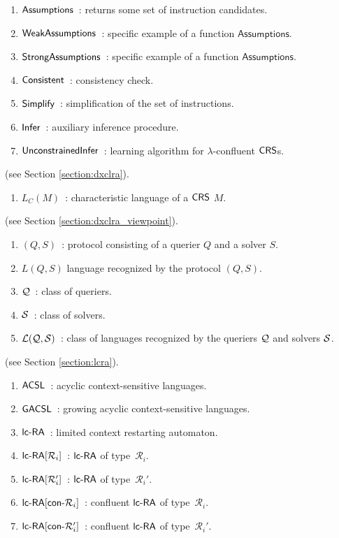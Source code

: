 \begin{enumerate}[]
\item $\textup{\sf Assumptions}$\ : returns some set of instruction candidates.
\item $\textup{\sf WeakAssumptions}$\ : specific example of a function $\mathsf{Assumptions}$.
\item $\textup{\sf StrongAssumptions}$\ : specific example of a function $\mathsf{Assumptions}$.
\item $\textup{\sf Consistent}$\ : consistency check.
\item $\textup{\sf Simplify}$\ : simplification of the set of instructions.
\item $\textup{\sf Infer}$\ : auxiliary inference procedure.
\item $\textup{\sf UnconstrainedInfer}$\ : learning algorithm for $\lambda$-confluent $\textup{\sf CRS\/}$s.
\end{enumerate}


 (see Section \ref{section:dxclra}).

\begin{enumerate}[]
\item $L_C(M)$\ : characteristic language of a $\textup{\sf CRS\/}$ $M$.
\end{enumerate}

 (see Section \ref{section:dxclra_viewpoint}).

\begin{enumerate}[]
\item $(Q, S)$\ : protocol consisting of a querier $Q$ and a solver $S$.
\item $L(Q, S)$ language recognized by the protocol $(Q, S)$.
\item $\mathcal{Q}$\ : class of queriers.
\item $\mathcal{S}$\ : class of solvers.
\item ${\cal L}(\mathcal{Q}, \mathcal{S})$\ : class of languages recognized by the queriers $\mathcal{Q}$ and solvers $\mathcal{S}$.
\end{enumerate}

 (see Section \ref{section:lcra}).

\begin{enumerate}[]
\item $\textup{\sf ACSL}$\ : acyclic context-sensitive languages.
\item $\textup{\sf GACSL}$\ : growing acyclic context-sensitive languages.
\item $\lcRA$\ : limited context restarting automaton.
\item $\lcRA[i]$\ : $\lcRA$ of type~$\mathcal{R}_i$.
\item $\lcRAp[i]$\ : $\lcRA$ of type~$\mathcal{R}_i'$.
\item $\textup{\sf lc-RA$[\textup{\sf con-}\mathcal{R}_i]$}$\ : confluent $\lcRA$ of type~$\mathcal{R}_i$.
\item $\textup{\sf lc-RA$[\textup{\sf con-}\mathcal{R}_i']$}$\ : confluent $\lcRA$ of type~$\mathcal{R}_i'$.
\end{enumerate}
